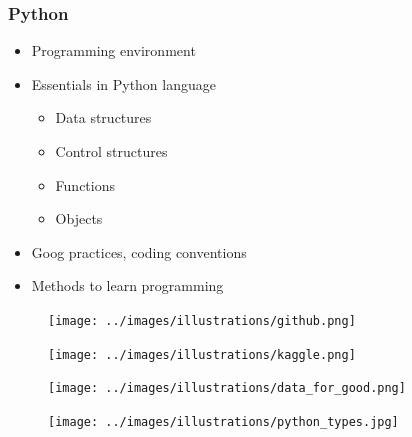 \begin{frame}\frametitle{Python}
   \begin{minipage}{0.68\linewidth}
      \begin{itemize}
         \item Programming environment
         \item Essentials in Python language
         \begin{itemize}
            \item Data structures
            \item Control structures
            \item Functions
            \item Objects
         \end{itemize}
         \item Goog practices, coding conventions
         \item Methods to learn programming
      \end{itemize}
   \end{minipage}
   \begin{minipage}{0.28\linewidth}
      \begin{figure}[H]
         \texttt{[image: ../images/illustrations/github.png]}
      \end{figure}
      \begin{figure}[H]
         \texttt{[image: ../images/illustrations/kaggle.png]}
      \end{figure}
      \begin{figure}[H]
         \texttt{[image: ../images/illustrations/data\_for\_good.png]}
      \end{figure}
   \end{minipage}


   \vspace{.2cm}
   \hspace{.7cm}
   \begin{minipage}{0.28\linewidth}
      \begin{figure}[H]
         \texttt{[image: ../images/illustrations/python\_types.jpg]}
      \end{figure}
   \end{minipage}
\end{frame}


